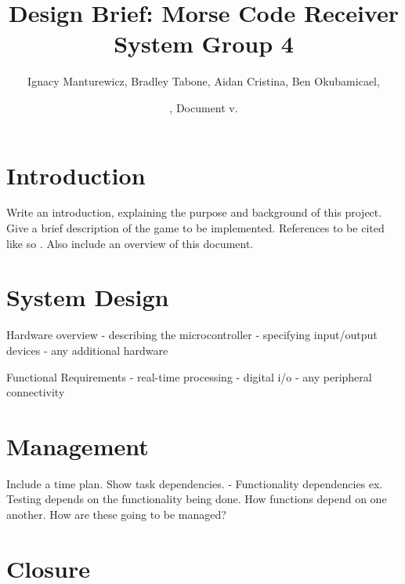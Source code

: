 \documentclass{cce2014-design}
\title{Design Brief: Morse Code Receiver System Group 4}
\author{
   Ignacy Manturewicz,
   Bradley Tabone,
   Aidan Cristina,
   Ben Okubamicael,
   
   }
\date{\svnMaxToday, Document v.\svnInfoMaxRevision}
\begin{document}
\maketitle


\section{Introduction}
Write an introduction, explaining the purpose and background of this project.
Give a brief description of the game to be implemented.
References to be cited like so \cite{stroustrup2000}.
Also include an overview of this document.

\section{System Design}

Hardware overview
   - describing the microcontroller 
   - specifying input/output devices 
   - any additional hardware 

Functional Requirements 
   - real-time processing
   - digital i/o 
   - any peripheral connectivity





\section{Management}
Include a time plan.
Show task dependencies. - Functionality dependencies ex. Testing depends on the functionality being done. How functions depend on one another.
How are these going to be managed?

\section{Closure}



\end{document}
